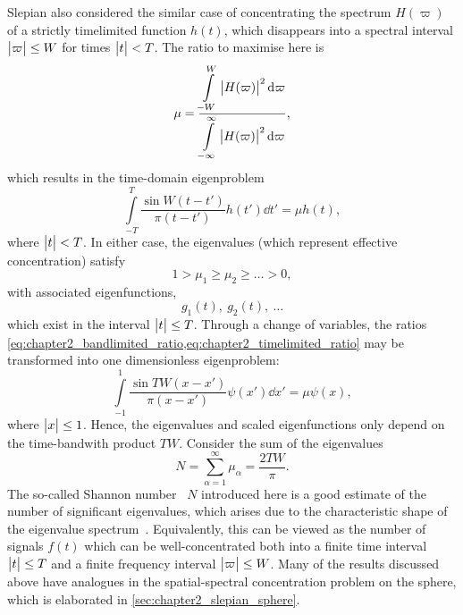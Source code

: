 Slepian also considered the similar case of concentrating the spectrum \(H(\varpi)\) of a strictly timelimited function \(h(t)\), which disappears into a spectral interval \(\big\lvert\varpi\big\rvert \leq W\) for times \(\big\lvert t\big\rvert < T\).
The ratio to maximise here is
%
\begin{equation}\label{eq:chapter2_timelimited_ratio}
	\mu
	= \frac{\displaystyle\int\limits_{-W}^{W} \big\lvert H(\varpi)\big\rvert^{2} \dd{\varpi}}
	{\displaystyle\int\limits_{-\infty}^{\infty} \big\lvert H(\varpi)\big\rvert^{2} \dd{\varpi}},
\end{equation}
%
which results in the time-domain eigenproblem
%
\begin{equation}
	\displaystyle\int\limits_{-T}^{T} \frac{\sin W(t-t')}{\pi(t-t')} h(t') \dd{t'}
	= \mu h(t),
\end{equation}
%
where \(\big\lvert t\big\rvert < T\).
In either case, the eigenvalues (which represent effective concentration) satisfy
%
\begin{equation}
	1 > \mu_{1} \geq \mu_{2} \geq \ldots > 0, %
\end{equation}
%
with associated eigenfunctions, \eg{}
%
\begin{equation}
	g_{1}(t),\ g_{2}(t),\ \ldots
\end{equation}
%
which exist in the interval \(\big\lvert t\big\rvert \leq T\).
Through a change of variables, the ratios \cref{eq:chapter2_bandlimited_ratio,eq:chapter2_timelimited_ratio} may be transformed into one dimensionless eigenproblem:
%
\begin{equation}
	\displaystyle\int\limits_{-1}^{1} \frac{\sin TW(x-x')}{\pi(x-x')} \psi(x') \dd{x'}
	= \mu \psi(x),
\end{equation}
%
where \(\big\lvert x\big\rvert \leq 1\).
Hence, the eigenvalues and scaled eigenfunctions only depend on the time-bandwith product \(TW\).
Consider the sum of the eigenvalues
%
\begin{equation}
	N
	= \displaystyle\sum\limits_{\alpha=1}^{\infty} \mu_{\alpha}
	= \frac{2TW}{\pi}.
\end{equation}
%
The so-called Shannon number~\cite{Percival1993} \(N\) introduced here is a good estimate of the number of significant eigenvalues, which arises due to the characteristic shape of the eigenvalue spectrum~\cite{Landau1965,Slepian1965}.
Equivalently, this can be viewed as the number of signals \(f(t)\) which can be well-concentrated both into a finite time interval \(\big\lvert t\big\rvert \leq T\) and a finite frequency interval \(\big\lvert\varpi\big\rvert \leq W\).
Many of the results discussed above have analogues in the spatial-spectral concentration problem on the sphere, which is elaborated in \cref{sec:chapter2_slepian_sphere}.

